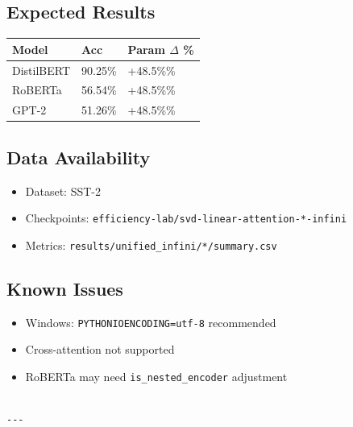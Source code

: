 \subsection{Expected Results}

\begin{table}[H]
\centering
\small
\begin{tabular}{lll}
\toprule
\textbf{Model} & \textbf{Acc} & \textbf{Param $\Delta$ \%} \\
\midrule
DistilBERT & 90.25\% & +48.5\%\% \\
RoBERTa & 56.54\% & +48.5\%\% \\
GPT-2 & 51.26\% & +48.5\%\% \\
\bottomrule
\end{tabular}
\end{table}

\subsection{Data Availability}

\begin{itemize}
\item Dataset: SST-2
\item Checkpoints: \texttt{efficiency-lab/svd-linear-attention-*-infini}
\item Metrics: \texttt{results/unified\_infini/*/summary.csv}

\end{itemize}
\subsection{Known Issues}

\begin{itemize}
\item Windows: \texttt{PYTHONIOENCODING=utf-8} recommended
\item Cross-attention not supported
\item RoBERTa may need \texttt{is\_nested\_encoder} adjustment
\end{itemize}
\begin{lstlisting}

---
\end{lstlisting}
